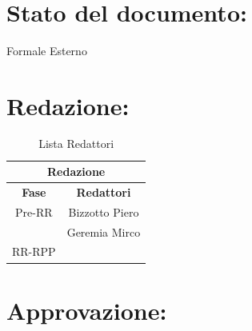 \newpage

\begin{center} %
	\begin{Huge}	
				\textbf{\TITOLODOC}
			\\
	\end{Huge}
\end{center}


\section*{\LARGE Stato del documento:}
\indent \indent
	Formale Esterno

\section*{\LARGE Redazione:}
	\begin{table}[!h]
		\begin{center}
			\begin{tabular}
				{|c|c|}
				\hline
				\multicolumn{2}{|c|}{ \textbf{Redazione} } \\
				\hline
				\textbf{Fase} & \textbf{Redattori} \\
				\hline
				{Pre-RR} &  Bizzotto Piero \\ & Geremia Mirco \\
				\hline
				{RR-RPP} & \\
				\hline
			\end{tabular}
			\caption{Lista Redattori} %
			\label{tabredazione}
		\end{center}
	\end{table}
	
\section*{\LARGE Approvazione:}

